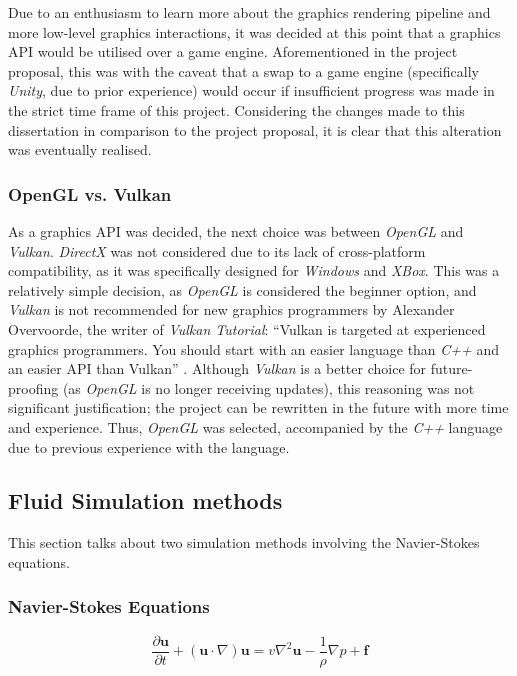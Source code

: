 \documentclass[a4paper, 12pt]{article}
\begin{document}
    Due to an enthusiasm to learn more about the graphics rendering pipeline and more low-level graphics interactions, it was decided at this point that a graphics API would be utilised over a game engine. Aforementioned in the project proposal, this was with the caveat that a swap to a game engine (specifically \textit{Unity}, due to prior experience) would occur if insufficient progress was made in the strict time frame of this project. Considering the changes made to this dissertation in comparison to the project proposal, it is clear that this alteration was eventually realised.

    \subsubsection{OpenGL vs. Vulkan}

    As a graphics API was decided, the next choice was between \textit{OpenGL} and \textit{Vulkan}. \textit{DirectX} was not considered due to its lack of cross-platform compatibility, as it was specifically designed for \textit{Windows} and \textit{XBox}. This was a relatively simple decision, as \textit{OpenGL} is considered the beginner option, and \textit{Vulkan} is not recommended for new graphics programmers by Alexander Overvoorde, the writer of \textit{Vulkan Tutorial}: ``Vulkan is targeted at experienced graphics programmers. You should start with an easier language than \textit{C++} and an easier API than Vulkan'' \cite{vulkancomment}. Although \textit{Vulkan} is a better choice for future-proofing (as \textit{OpenGL} is no longer receiving updates), this reasoning was not significant justification; the project can be rewritten in the future with more time and experience. Thus, \textit{OpenGL} was selected, accompanied by the \textit{C++} language due to previous experience with the language.
    
    \subsection{Fluid Simulation methods}

    This section talks about two simulation methods involving the Navier-Stokes equations.

    \subsubsection{Navier-Stokes Equations}

    \begin{equation}
        \frac{\partial{\textbf{u}}}{\partial{t}} + (\textbf{u} \cdot\nabla)\textbf{u} = v\nabla^2 \textbf{u} - \frac{1}{\rho}\nabla p + \textbf{f}
    \end{equation}
\end{document}
